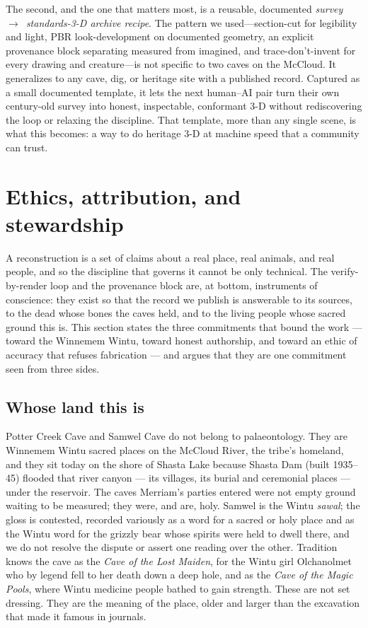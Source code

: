 \documentclass[11pt]{article}
\begin{document}
The second, and the one that matters most, is a reusable, documented \emph{survey~$\rightarrow$~standards-3-D archive recipe}. The pattern we used---section-cut for legibility and light, PBR look-development on documented geometry, an explicit provenance block separating measured from imagined, and trace-don't-invent for every drawing and creature---is not specific to two caves on the McCloud. It generalizes to any cave, dig, or heritage site with a published record. Captured as a small documented template, it lets the next human--AI pair turn their own century-old survey into honest, inspectable, conformant 3-D without rediscovering the loop or relaxing the discipline. That template, more than any single scene, is what this becomes: a way to do heritage 3-D at machine speed that a community can trust.

\section{Ethics, attribution, and stewardship}\label{sec:ethics}

A reconstruction is a set of claims about a real place, real animals, and real
people, and so the discipline that governs it cannot be only technical. The
verify-by-render loop and the provenance block are, at bottom, instruments of
conscience: they exist so that the record we publish is answerable to its
sources, to the dead whose bones the caves held, and to the living people whose
sacred ground this is. This section states the three commitments that bound the
work --- toward the Winnemem Wintu, toward honest authorship, and toward an
ethic of accuracy that refuses fabrication --- and argues that they are one
commitment seen from three sides.

\subsection{Whose land this is}

Potter Creek Cave and Samwel Cave do not belong to palaeontology. They are
Winnemem Wintu sacred places on the McCloud River, the tribe's homeland, and
they sit today on the shore of Shasta Lake because Shasta Dam (built 1935--45)
flooded that river canyon --- its villages, its burial and ceremonial places ---
under the reservoir. The caves Merriam's parties entered were not empty ground
waiting to be measured; they were, and are, holy. Samwel is the Wintu
\emph{sawal}; the gloss is contested, recorded variously as a word for a sacred
or holy place and as the Wintu word for the grizzly bear whose spirits were held
to dwell there, and we do not resolve the dispute or assert one reading over the
other. Tradition knows the cave as the \emph{Cave of the Lost Maiden}, for the
Wintu girl Olchanolmet who by legend fell to her death down a deep hole, and as
the \emph{Cave of the Magic Pools}, where Wintu medicine people bathed to gain
strength. These are not set dressing. They are the meaning of the place, older
and larger than the excavation that made it famous in journals.
\end{document}

